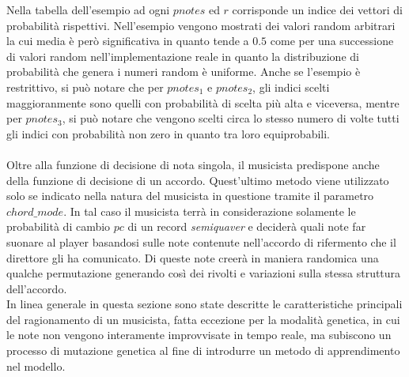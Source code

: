 Nella tabella dell'esempio ad ogni $pnotes$ ed $r$ corrisponde un indice
dei vettori di probabilità rispettivi. Nell'esempio vengono mostrati dei
valori random arbitrari la cui media è però significativa in quanto
tende a $0.5$ come per una successione di valori random nell'implementazione 
reale in quanto la distribuzione di probabilità che genera i numeri
random è uniforme. Anche se l'esempio è restrittivo, si può notare che
per $pnotes_1$ e $pnotes_2$, gli indici scelti maggioranmente sono  quelli 
con probabilità di scelta più alta e viceversa, mentre per $pnotes_3$, si 
può notare che vengono scelti circa lo stesso numero di volte 
tutti gli indici con probabilità non zero in quanto tra loro
equiprobabili.\\\\
Oltre alla funzione di decisione di nota singola, il musicista
predispone anche della funzione di decisione di un accordo. Quest'ultimo
metodo viene utilizzato solo se indicato nella natura del musicista in
questione tramite il parametro $chord\_mode$. In tal caso il musicista
terrà in considerazione solamente le probabilità di cambio $pc$ di un
record \emph{semiquaver} e deciderà quali note far suonare al player
basandosi sulle note contenute nell'accordo di rifermento che il direttore
gli ha comunicato. Di queste note creerà in maniera randomica una
qualche permutazione generando così dei rivolti e variazioni sulla
stessa struttura dell'accordo.\\
In linea generale in questa sezione sono state descritte le
caratteristiche principali del ragionamento di un musicista, fatta
eccezione per la modalità genetica, in cui le note non vengono
interamente improvvisate in tempo reale, ma subiscono un processo di 
mutazione genetica al fine di introdurre un metodo di apprendimento nel
modello. 
